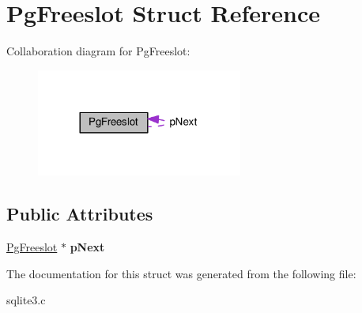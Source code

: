 \hypertarget{structPgFreeslot}{}\section{Pg\+Freeslot Struct Reference}
\label{structPgFreeslot}


Collaboration diagram for Pg\+Freeslot\+:\nopagebreak
\begin{figure}[H]
\begin{center}
\leavevmode
\includegraphics[width=192pt]{structPgFreeslot__coll__graph}
\end{center}
\end{figure}
\subsection*{Public Attributes}
\begin{DoxyCompactItemize}
\item 
\hyperlink{structPgFreeslot}{Pg\+Freeslot} $\ast$ {\bfseries p\+Next}\hypertarget{structPgFreeslot_ac38a6e51f86c650fb943585d7b6c8b70}{}\label{structPgFreeslot_ac38a6e51f86c650fb943585d7b6c8b70}

\end{DoxyCompactItemize}


The documentation for this struct was generated from the following file\+:\begin{DoxyCompactItemize}
\item 
sqlite3.\+c\end{DoxyCompactItemize}
